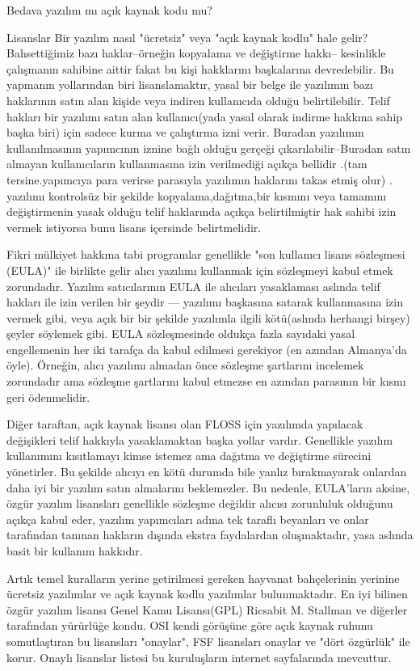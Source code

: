 \documentclass[10pt,a5paper]{book}
\begin{document}
\begin{section}{Bedava yazılım mı açık kaynak kodu mu?}
\begin{subsection}{Lisanslar}
Bir yazılım nasıl  "ücretsiz" veya "açık kaynak kodlu" hale gelir?  Bahsettiğimiz bazı haklar--örneğin kopyalama ve değiştirme hakkı-- kesinlikle çalışmanın sahibine aittir fakat bu kişi hakklarını başkalarına devredebilir. Bu yapmanın  yollarından biri lisanslamaktır, yasal bir belge ile yazılımın bazı haklarının satın alan kişide veya indiren kullanıcıda olduğu belirtilebilir. Telif hakları bir yazılımı satın alan kullanıcı(yada yasal olarak indirme hakkına sahip başka biri) için sadece kurma ve çalıştırma izni verir. Buradan yazılımın kullanılmasının yapımcının iznine bağlı olduğu gerçeği çıkarılabilir--Buradan satın almayan kullanıcıların kullanmasına izin verilmediği açıkça bellidir .(tam tersine.yapımcıya para verirse parasıyla yazılımın haklarını takas etmiş olur) . yazılımı kontrolsüz bir şekilde  kopyalama,dağıtma,bir kısmını veya tamamını değiştirmenin yasak olduğu telif haklarında açıkça belirtilmiştir hak sahibi izin vermek istiyorsa bunu lisans içersinde belirtmelidir.

Fikri mülkiyet hakkına tabi programlar genellikle "son kullanıcı lisans sözleşmesi (EULA)" ile birlikte gelir alıcı yazılımı kullanmak için  sözleşmeyi kabul etmek zorundadır. Yazılım satıcılarının EULA ile  alıcıları yasaklaması aslında telif hakları ile izin verilen bir şeydir ---
yazılımı başkasına  satarak kullanmasına izin vermek gibi, veya açık bir bir şekilde yazılımla ilgili kötü(aslında herhangi birşey) şeyler söylemek gibi.
EULA  sözleşmesinde oldukça fazla sayıdaki yasal engellemenin her iki tarafça da kabul edilmesi gerekiyor (en azından Almanya'da öyle). Örneğin, alıcı yazılımı almadan önce sözleşme şartlarını incelemek zorundadır ama sözleşme şartlarını kabul etmezse en azından parasının bir kısmı geri ödenmelidir.

Diğer taraftan, açık kaynak lisansı olan FLOSS için yazılımda yapılacak değişikleri telif hakkıyla yasaklamaktan başka yollar vardır. Genellikle yazılım kullanımını kısıtlamayı kimse istemez ama dağıtma ve değiştirme sürecini yönetirler. Bu şekilde alıcıyı en kötü durumda bile yanlız bırakmayarak onlardan daha iyi bir yazılım satın almalarını beklemezler. Bu nedenle, EULA'ların aksine, özgür yazılım lisansları genellikle sözleşme değildir alıcısı zorunluluk olduğunu açıkça kabul eder, yazılım yapımcıları adına tek taraflı beyanları ve onlar tarafından tanınan hakların dışında ekstra faydalardan oluşmaktadır, yasa aslında basit bir kullanım hakkıdır.

Artık temel kuralların yerine getirilmesi gereken hayvanat bahçelerinin yerinine ücretsiz yazılımlar ve  açık kaynak kodlu yazılımlar bulunmaktadır. En iyi bilinen özgür yazılım lisansı Genel Kamu Lisansı(GPL)  Ricsabit M. Stallman ve diğerler tarafından yürürlüğe kondu. OSI kendi görüşüne göre açık kaynak ruhunu somutlaştıran bu lisansları "onaylar", FSF  lisansları onaylar ve "dört özgürlük" ile korur. Onaylı lisanslar listesi bu kuruluşların internet sayfalarında mevcuttur.


\end{subsection}
\end{section}
\end{document}
